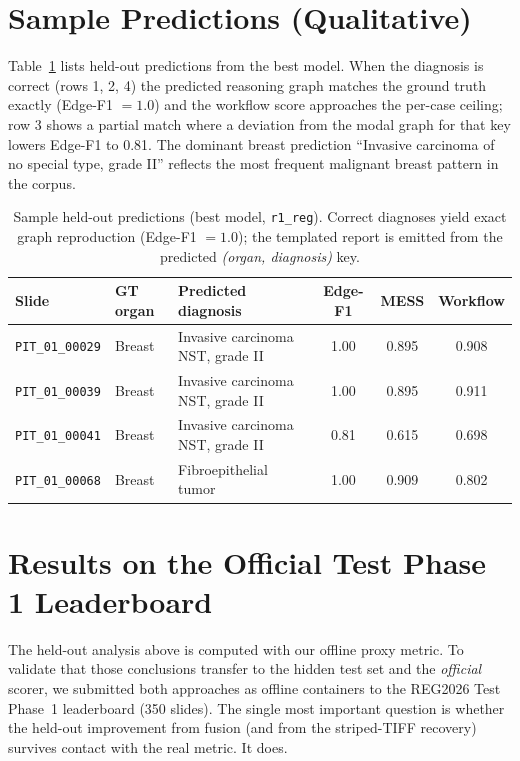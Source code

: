 \documentclass[11pt,a4paper]{article}
\newcommand{\code}[1]{\texttt{\small #1}}
\begin{document}
\section{Sample Predictions (Qualitative)}
\label{sec:qual}

Table~\ref{tab:samples} lists held-out predictions from the best model. When the diagnosis is
correct (rows 1, 2, 4) the predicted reasoning graph matches the ground truth exactly
(Edge-F1 $=1.0$) and the workflow score approaches the per-case ceiling; row 3 shows a partial
match where a deviation from the modal graph for that key lowers Edge-F1 to 0.81. The dominant
breast prediction ``Invasive carcinoma of no special type, grade II'' reflects the most frequent
malignant breast pattern in the corpus.

\begin{table}[h]
\centering
\caption{Sample held-out predictions (best model, \code{r1\_reg}). Correct diagnoses yield exact
graph reproduction (Edge-F1 $=1.0$); the templated report is emitted from the predicted
\emph{(organ, diagnosis)} key.}
\label{tab:samples}
\begin{tabular}{llp{5.4cm}ccc}
\toprule
Slide & GT organ & Predicted diagnosis & Edge-F1 & MESS & Workflow \\
\midrule
\code{PIT\_01\_00029} & Breast & Invasive carcinoma NST, grade II & 1.00 & 0.895 & 0.908 \\
\code{PIT\_01\_00039} & Breast & Invasive carcinoma NST, grade II & 1.00 & 0.895 & 0.911 \\
\code{PIT\_01\_00041} & Breast & Invasive carcinoma NST, grade II & 0.81 & 0.615 & 0.698 \\
\code{PIT\_01\_00068} & Breast & Fibroepithelial tumor            & 1.00 & 0.909 & 0.802 \\
\bottomrule
\end{tabular}
\end{table}

\section{Results on the Official Test Phase 1 Leaderboard}
\label{sec:testphase}

The held-out analysis above is computed with our offline proxy metric. To validate that those
conclusions transfer to the hidden test set and the \emph{official} scorer, we submitted both
approaches as offline containers to the REG2026 Test Phase~1 leaderboard (350 slides). The
single most important question is whether the held-out improvement from fusion (and from the
striped-TIFF recovery) survives contact with the real metric. It does.
\end{document}
